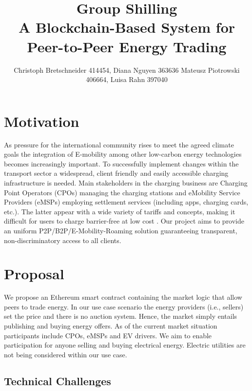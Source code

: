 \documentclass[10pt]{adtreport}
\begin{document}
\title{Group Shilling \\
A Blockchain-Based System for Peer-to-Peer Energy Trading}
\author{Christoph Bretschneider 414454, Diana Nguyen 363636
\newline Mateusz Piotrowski 406664, Luisa Rahn 397040
}
\institute{}

\maketitle              


\section{Motivation}
As pressure for the international community rises to meet the agreed climate goals the integration of E-mobility among other low-carbon energy technologies becomes increasingly important. To successfully implement changes within the transport sector a widespread, client friendly and easily accessible charging infrastructure is needed. Main stakeholders in the charging business are Charging Point Operators (CPOs) managing the charging stations and eMobility Service Providers (eMSPs) employing settlement services (including apps, charging cards, etc.). The latter appear with a wide variety of tariffs and concepts, making it difficult for users to charge barrier-free at low cost \cite{lade-report}. Our project aims to provide an uniform P2P/B2P/E-Mobility-Roaming solution guaranteeing transparent, non-discriminatory access to all clients.



\section{Proposal}
We propose an Ethereum smart contract \cite{wood2014ethereum} containing the market logic that allow peers to trade energy. In our use case scenario the energy providers (i.e., sellers) set the price and there is no auction system. Hence, the market simply entails publishing and buying energy offers.
As of the current market situation participants include CPOs, eMSPs and EV drivers. We aim to enable participation for anyone selling and buying electrical energy. Electric utilities are not being considered within our use case.

\subsection*{Technical Challenges}
\end{document}
